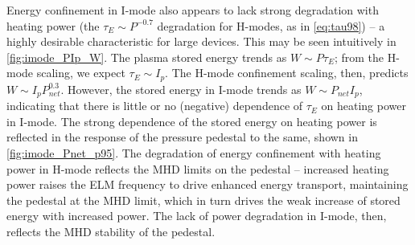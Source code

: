 \begin{figure}[p]
 \pushtooutside
\end{figure}

Energy confinement in I-mode also appears to lack strong degradation with heating power (\cf the $\tau_E \sim P^{-0.7}$ degradation for H-modes, as in \cref{eq:tau98}) -- a highly desirable characteristic for large devices.  This may be seen intuitively in \cref{fig:imode_PIp_W}.  The plasma stored energy trends as $W \sim P \tau_E$; from the H-mode scaling, we expect $\tau_E \sim I_p$.  The H-mode confinement scaling, then, predicts $W \sim I_p P_{net}^{0.3}$.  However, the stored energy in I-mode trends as $W \sim P_{net} I_p$, indicating that there is little or no (negative) dependence of $\tau_E$ on heating power in I-mode.  The strong dependence of the stored energy on heating power is reflected in the response of the pressure pedestal to the same, shown in \cref{fig:imode_Pnet_p95}.  The degradation of energy confinement with heating power in H-mode reflects the MHD limits on the pedestal -- increased heating power raises the ELM frequency to drive enhanced energy transport, maintaining the pedestal at the MHD limit, which in turn drives the weak increase of stored energy with increased power.  The lack of power degradation in I-mode, then, reflects the MHD stability of the pedestal.

